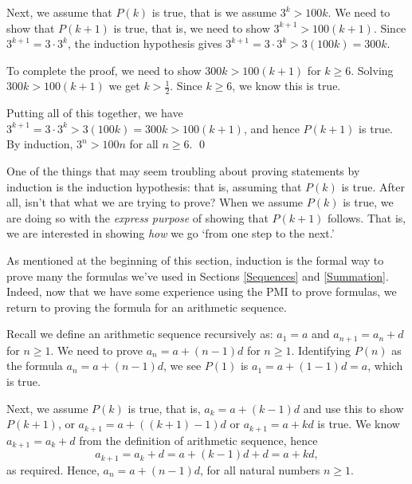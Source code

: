 \documentclass{ximera}
\begin{document}
\begin{ex}
\begin{enumerate}
\smallskip

Next, we assume that $P(k)$ is true, that is we assume $3^{k} > 100k$.  We need to show that $P(k+1)$ is true, that is, we need to show $3^{k+1} > 100(k+1)$.  Since $3^{k+1} = 3 \cdot 3^{k}$, the induction hypothesis gives $3^{k+1} = 3 \cdot 3^{k} > 3(100k) = 300k$.  

\smallskip

To complete the proof, we need to show $300k > 100(k+1)$ for $k \geq 6$. Solving $300k > 100(k+1)$ we get $k > \frac{1}{2}$.  Since $k \geq 6$, we know this is true.  

\smallskip

Putting all of this together, we have $3^{k+1} = 3 \cdot 3^{k} > 3(100k) = 300k > 100(k+1)$, and hence $P(k+1)$ is true.  By induction, $3^{n} > 100n$ for all $n \geq 6$.  \qed

\end{enumerate}

\end{ex}

One of the things that may seem troubling about proving statements by induction is the induction hypothesis:  that is, assuming that $P(k)$ is true.  After all, isn't that what we are trying to prove?   When we assume $P(k)$ is true, we are doing so with the \textit{express purpose} of showing that $P(k+1)$ follows. That is, we are interested in showing \textit{how} we go `from one step to the next.'  

\smallskip

As mentioned at the beginning of this section, induction is the formal way to prove many the formulas we've used in Sections \ref{Sequences} and \ref{Summation}.  Indeed, now that we have some experience using the PMI to prove formulas, we return to proving the formula for an arithmetic sequence.

\smallskip

Recall we define an arithmetic sequence recursively as:  $a_{1} = a$ and $a_{n+1} = a_{n} + d$ for $n \geq 1$.  We need to prove $a_{n} = a + (n-1) d$ for $n \geq 1$.  Identifying $P(n)$ as the formula $a_{n} = a + (n-1)d$, we see $P(1)$ is $a_{1} = a + (1-1) d = a$, which is true.  
\smallskip

Next, we assume $P(k)$ is true, that is, $a_{k} = a + (k-1)d$ and use this to show  $P(k+1)$, or $a_{k+1} = a+((k+1)-1)d$ or $a_{k+1} = a + kd$ is true.  We know $a_{k+1} = a_{k} + d$ from the definition of arithmetic sequence, hence \[ a_{k+1} = a_{k} + d = a + (k-1)d + d= a + kd,\]
as required.  Hence, $a_{n} = a + (n-1)d$, for all natural numbers $n \geq 1$.
\end{document}
